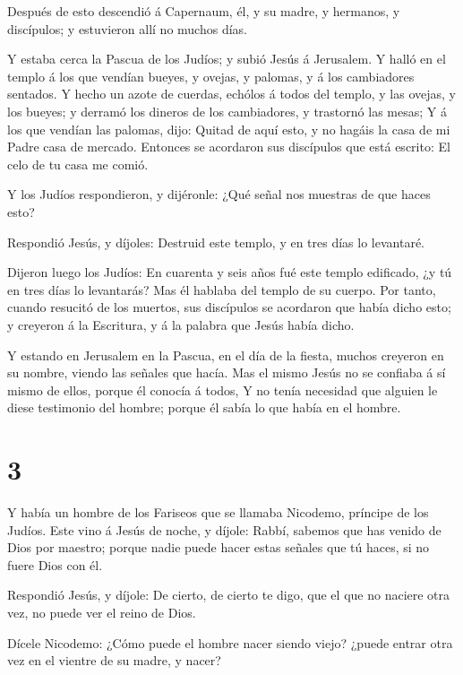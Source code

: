  Después de esto descendió á Capernaum, él, y su madre, y
hermanos, y discípulos; y estuvieron allí no muchos días.

 Y estaba cerca la Pascua de los Judíos; y subió Jesús á
Jerusalem.  Y halló en el templo á los que vendían bueyes,
y ovejas, y palomas, y á los cambiadores sentados.  Y hecho
un azote de cuerdas, echólos á todos del templo, y las ovejas, y los
bueyes; y derramó los dineros de los cambiadores, y trastornó las mesas;
 Y á los que vendían las palomas, dijo: Quitad de aquí
esto, y no hagáis la casa de mi Padre casa de mercado. 
Entonces se acordaron sus discípulos que está escrito: El celo de tu
casa me comió.

 Y los Judíos respondieron, y dijéronle: ¿Qué señal nos
muestras de que haces esto?

 Respondió Jesús, y díjoles: Destruid este templo, y en
tres días lo levantaré.

 Dijeron luego los Judíos: En cuarenta y seis años fué este
templo edificado, ¿y tú en tres días lo levantarás?  Mas él
hablaba del templo de su cuerpo.  Por tanto, cuando
resucitó de los muertos, sus discípulos se acordaron que había dicho
esto; y creyeron á la Escritura, y á la palabra que Jesús había dicho.

 Y estando en Jerusalem en la Pascua, en el día de la
fiesta, muchos creyeron en su nombre, viendo las señales que hacía.
 Mas el mismo Jesús no se confiaba á sí mismo de ellos,
porque él conocía á todos,  Y no tenía necesidad que
alguien le diese testimonio del hombre; porque él sabía lo que había en
el hombre.

\hypertarget{section-2}{%
\section{3}\label{section-2}}

 Y había un hombre de los Fariseos que se llamaba Nicodemo,
príncipe de los Judíos.  Este vino á Jesús de noche, y
díjole: Rabbí, sabemos que has venido de Dios por maestro; porque nadie
puede hacer estas señales que tú haces, si no fuere Dios con él.

 Respondió Jesús, y díjole: De cierto, de cierto te digo,
que el que no naciere otra vez, no puede ver el reino de Dios.

 Dícele Nicodemo: ¿Cómo puede el hombre nacer siendo viejo?
¿puede entrar otra vez en el vientre de su madre, y nacer?

